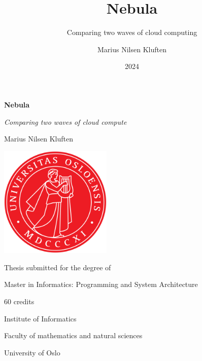 \documentclass[
  table]{report}
\title{Nebula}
\subtitle{Comparing two waves of cloud computing}
\author{Marius Nilsen Kluften}
\date{2024}
\begin{document}
\maketitle

\begin{titlepage}
\thispagestyle{fancy}
\centering
{\Huge\bfseries Nebula\par}

\vspace{0.5cm}

{\Huge\itshape Comparing two waves of cloud compute\par}

\vspace{1cm}

{\Large Marius Nilsen Kluften\par}

\vspace{1cm}

\includegraphics[width=0.4\textwidth]{assets/uio-logo.png}\\[1cm]

{\Large Thesis submitted for the degree of\par}
{\Large Master in Informatics: Programming and System Architecture\par}

\vspace{0.25cm}

{\Large 60 credits\par}

\vspace{1cm}

{\Large Institute of Informatics\par}

{\Large Faculty of mathematics and natural sciences\par}

{\Large University of Oslo\par}

\end{titlepage}
\end{document}
